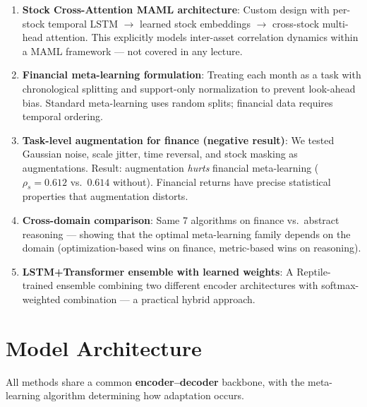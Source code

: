 \documentclass[11pt,a4paper]{article}
\begin{document}
\begin{tcolorbox}[colback=orange!3,colframe=novelorange,title=\textbf{What We Did Beyond Course Material}]
\begin{enumerate}[nosep,leftmargin=*]
  \item \textbf{Stock Cross-Attention MAML architecture}: Custom design with per-stock temporal LSTM $\to$ learned stock embeddings $\to$ cross-stock multi-head attention. This explicitly models inter-asset correlation dynamics within a MAML framework --- not covered in any lecture.
  \item \textbf{Financial meta-learning formulation}: Treating each month as a task with chronological splitting and support-only normalization to prevent look-ahead bias. Standard meta-learning uses random splits; financial data requires temporal ordering.
  \item \textbf{Task-level augmentation for finance (negative result)}: We tested Gaussian noise, scale jitter, time reversal, and stock masking as augmentations. Result: augmentation \emph{hurts} financial meta-learning ($\rho_s = 0.612$ vs.\ $0.614$ without). Financial returns have precise statistical properties that augmentation distorts.
  \item \textbf{Cross-domain comparison}: Same 7 algorithms on finance vs.\ abstract reasoning --- showing that the optimal meta-learning family depends on the domain (optimization-based wins on finance, metric-based wins on reasoning).
  \item \textbf{LSTM+Transformer ensemble with learned weights}: A Reptile-trained ensemble combining two different encoder architectures with softmax-weighted combination --- a practical hybrid approach.
\end{enumerate}
\end{tcolorbox}

\section{Model Architecture}

All methods share a common \textbf{encoder--decoder} backbone, with the meta-learning algorithm determining how adaptation occurs.
\end{document}
